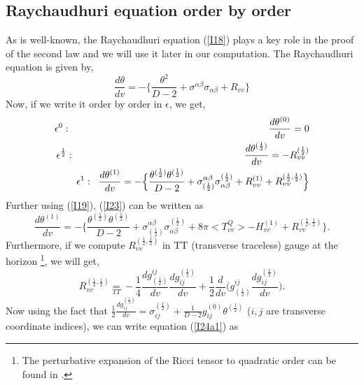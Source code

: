 \documentclass[12pt]{article}
\begin{document}
\subsection{Raychaudhuri equation order by order}
As is well-known, the Raychaudhuri equation (\ref{I18}) plays a key role in the proof of the second law and we will use it later in our computation. The Raychaudhuri equation is given by,
\begin{equation}\label{I20}
\frac{d\theta}{dv}=-\Big\{\frac{\theta^2}{D-2} + \sigma^{\alpha \beta} \sigma_{\alpha \beta} + R_{vv} \Big\}
\end{equation}
Now, if we write it order by order in $\epsilon$, we get,
\begin{eqnarray}
\epsilon^{0}: \hspace{71mm}   \frac{d\theta^{(0)}}{dv}=0 \label{I21}\\
\epsilon^{\frac{1}{2}}:\hspace{61mm} \frac{d\theta^{(\frac{1}{2})}}{dv}= -R^{(\frac{1}{2})}_{vv} \label{I22}\\
\epsilon^1 :  \hspace{2mm}  \frac{d\theta^{(1)}}{dv}=-\Big\{\frac{\theta^{(\frac{1}{2})} \theta^{(\frac{1}{2})}}{D-2} + \sigma^{\alpha \beta}_{(\frac{1}{2})} \sigma_{\alpha \beta}^{(\frac{1}{2})} +R^{(1)}_{vv}  + R^{(\frac{1}{2},\frac{1}{2})}_{vv}\Big\}\label{I23}
\end{eqnarray}
Further using (\ref{I19}), (\ref{I23}) can be written as
\begin{equation}\label{I24a}
\frac{d\theta^{(1)}}{dv}=-\Big\{\frac{\theta^{(\frac{1}{2})} \theta^{(\frac{1}{2})}}{D-2} + \sigma^{\alpha \beta}_{(\frac{1}{2})} \sigma_{\alpha \beta}^{(\frac{1}{2})} +8\pi <T^Q_{vv}> - H^{(1)}_{vv} + R^{(\frac{1}{2},\frac{1}{2})}_{vv}\Big\}.
\end{equation}
Furthermore, if we compute $R_{vv}^{(\frac{1}{2},\frac{1}{2})}$  in TT (transverse traceless) gauge at the horizon \footnote{The perturbative expansion of the Ricci tensor to quadratic order can be found in \cite{MTW}.}, we will get,
\begin{equation}\label{I24a1}
R^{(\frac{1}{2},\frac{1}{2})}_{vv} \underset{TT}{=}-\frac{1}{4}\frac{d g^{ij}_{(\frac{1}{2})}}{dv}\frac{d g_{ij}^{(\frac{1}{2})}}{dv}+ \frac{1}{2} \frac{d}{dv}\Big( g^{ij}_{(\frac{1}{2})}\frac{d g_{ij}^{(\frac{1}{2})}}{dv}\Big).
\end{equation}
Now using the fact that $\frac{1}{2}\frac{d g_{ij}^{(\frac{1}{2})}}{dv}= \sigma^{(\frac{1}{2})}_{ij}+\frac{1}{D-2}g^{(0)}_{ij}\theta^{(\frac{1}{2})}$ \cite{AW} ($i,j$ are transverse coordinate indices), we can write equation (\ref{I24a1}) as
\end{document}
